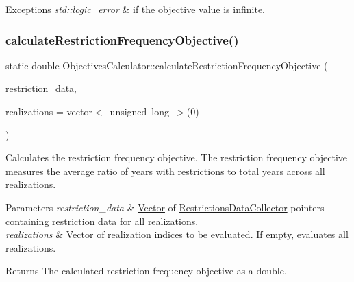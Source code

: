 \begin{DoxyExceptions}{Exceptions}
{\em std\+::logic\+\_\+error} & if the objective value is infinite. \\
\hline
\end{DoxyExceptions}
\mbox{\label{classObjectivesCalculator_ab01034697c3e9876fd06bff0c880b5ca}} 
\subsubsection{\texorpdfstring{calculate\+Restriction\+Frequency\+Objective()}{calculateRestrictionFrequencyObjective()}}
{\footnotesize\ttfamily static double Objectives\+Calculator\+::calculate\+Restriction\+Frequency\+Objective (\begin{DoxyParamCaption}\item[{const vector$<$ \mbox{\hyperlink{classRestrictionsDataCollector}{Restrictions\+Data\+Collector}} $\ast$$>$ \&}]{restriction\+\_\+data,  }\item[{vector$<$ unsigned long $>$}]{realizations = {\ttfamily vector$<$~unsigned~long~$>$(0)} }\end{DoxyParamCaption})\hspace{0.3cm}{\ttfamily [static]}}



Calculates the restriction frequency objective. The restriction frequency objective measures the average ratio of years with restrictions to total years across all realizations. 


\begin{DoxyParams}{Parameters}
{\em restriction\+\_\+data} & \mbox{\hyperlink{classVector}{Vector}} of {\ttfamily \mbox{\hyperlink{classRestrictionsDataCollector}{Restrictions\+Data\+Collector}}} pointers containing restriction data for all realizations. \\
\hline
{\em realizations} & \mbox{\hyperlink{classVector}{Vector}} of realization indices to be evaluated. If empty, evaluates all realizations.\\
\hline
\end{DoxyParams}
\begin{DoxyReturn}{Returns}
The calculated restriction frequency objective as a double.
\end{DoxyReturn}

